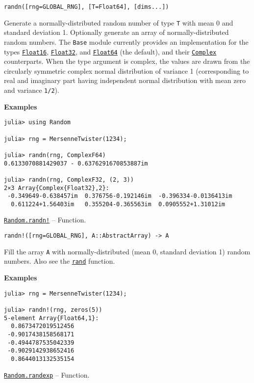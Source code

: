 \begin{adjustwidth}{2em}{0pt}


\begin{verbatim}
randn([rng=GLOBAL_RNG], [T=Float64], [dims...])
\end{verbatim}

Generate a normally-distributed random number of type \texttt{T} with mean 0 and standard deviation 1. Optionally generate an array of normally-distributed random numbers. The \texttt{Base} module currently provides an implementation for the types \hyperlink{2727296760866702904}{\texttt{Float16}}, \hyperlink{8101639384272933082}{\texttt{Float32}}, and \hyperlink{5027751419500983000}{\texttt{Float64}} (the default), and their \hyperlink{11302502367029942782}{\texttt{Complex}} counterparts. When the type argument is complex, the values are drawn from the circularly symmetric complex normal distribution of variance 1 (corresponding to real and imaginary part having independent normal distribution with mean zero and variance \texttt{1/2}).

\textbf{Examples}


\begin{verbatim}
julia> using Random

julia> rng = MersenneTwister(1234);

julia> randn(rng, ComplexF64)
0.6133070881429037 - 0.6376291670853887im

julia> randn(rng, ComplexF32, (2, 3))
2×3 Array{Complex{Float32},2}:
 -0.349649-0.638457im  0.376756-0.192146im  -0.396334-0.0136413im
  0.611224+1.56403im   0.355204-0.365563im  0.0905552+1.31012im
\end{verbatim}



\end{adjustwidth}
\hypertarget{15194943605954659727}{} 
\hyperlink{15194943605954659727}{\texttt{Random.randn!}}  -- {Function.}

\begin{adjustwidth}{2em}{0pt}


\begin{verbatim}
randn!([rng=GLOBAL_RNG], A::AbstractArray) -> A
\end{verbatim}

Fill the array \texttt{A} with normally-distributed (mean 0, standard deviation 1) random numbers. Also see the \hyperlink{7668863842145012694}{\texttt{rand}} function.

\textbf{Examples}


\begin{verbatim}
julia> rng = MersenneTwister(1234);

julia> randn!(rng, zeros(5))
5-element Array{Float64,1}:
  0.8673472019512456
 -0.9017438158568171
 -0.4944787535042339
 -0.9029142938652416
  0.8644013132535154
\end{verbatim}



\end{adjustwidth}
\hypertarget{17131026676213441996}{} 
\hyperlink{17131026676213441996}{\texttt{Random.randexp}}  -- {Function.}

